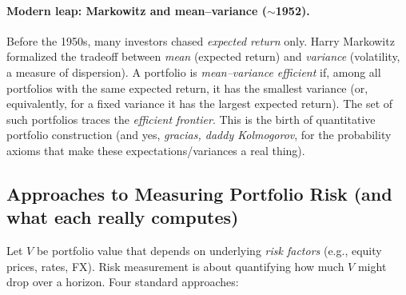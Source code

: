 \paragraph{Modern leap: Markowitz and mean--variance (\(\sim\)1952).}
Before the 1950s, many investors chased \emph{expected return} only. Harry Markowitz formalized the tradeoff between \emph{mean} (expected return) and \emph{variance} (volatility, a measure of dispersion). A portfolio is \emph{mean--variance efficient} if, among all portfolios with the same expected return, it has the smallest variance (or, equivalently, for a fixed variance it has the largest expected return). The set of such portfolios traces the \emph{efficient frontier}. This is the birth of quantitative portfolio construction (and yes, \emph{gracias, daddy Kolmogorov}, for the probability axioms that make these expectations/variances a real thing).

\subsection*{Approaches to Measuring Portfolio Risk (and what each really computes)}

Let \(V\) be portfolio value that depends on underlying \emph{risk factors} (e.g., equity prices, rates, FX). Risk measurement is about quantifying how much \(V\) might drop over a horizon. Four standard approaches:


